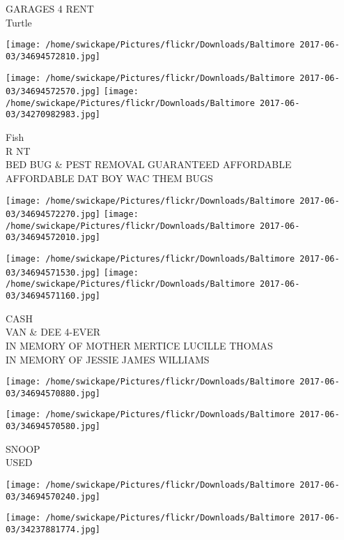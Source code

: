 \documentclass[10pt,letterpaper]{article}
\begin{document}
GARAGES 4 RENT\\
Turtle\\
\pagebreak

\texttt{[image: /home/swickape/Pictures/flickr/Downloads/Baltimore 2017-06-03/34694572810.jpg]}

\vspace{0.25in}
\texttt{[image: /home/swickape/Pictures/flickr/Downloads/Baltimore 2017-06-03/34694572570.jpg]}
\texttt{[image: /home/swickape/Pictures/flickr/Downloads/Baltimore 2017-06-03/34270982983.jpg]}

Fish\\
R NT\\
BED BUG \& PEST REMOVAL GUARANTEED AFFORDABLE AFFORDABLE DAT BOY WAC THEM BUGS\\
\pagebreak

\texttt{[image: /home/swickape/Pictures/flickr/Downloads/Baltimore 2017-06-03/34694572270.jpg]}
\texttt{[image: /home/swickape/Pictures/flickr/Downloads/Baltimore 2017-06-03/34694572010.jpg]}

\texttt{[image: /home/swickape/Pictures/flickr/Downloads/Baltimore 2017-06-03/34694571530.jpg]}
\texttt{[image: /home/swickape/Pictures/flickr/Downloads/Baltimore 2017-06-03/34694571160.jpg]}

CASH\\
VAN \& DEE 4{-}EVER\\
IN MEMORY OF MOTHER MERTICE LUCILLE THOMAS\\
IN MEMORY OF JESSIE JAMES WILLIAMS\\
\pagebreak

\texttt{[image: /home/swickape/Pictures/flickr/Downloads/Baltimore 2017-06-03/34694570880.jpg]}

\vspace{0.25in}
\texttt{[image: /home/swickape/Pictures/flickr/Downloads/Baltimore 2017-06-03/34694570580.jpg]}

SNOOP\\
USED\\
\pagebreak

\texttt{[image: /home/swickape/Pictures/flickr/Downloads/Baltimore 2017-06-03/34694570240.jpg]}

\vspace{0.25in}
\texttt{[image: /home/swickape/Pictures/flickr/Downloads/Baltimore 2017-06-03/34237881774.jpg]}
\end{document}
